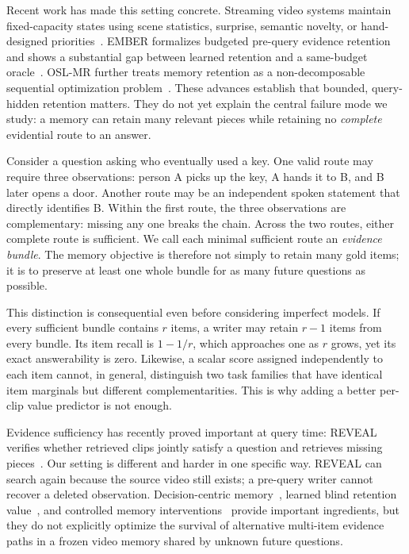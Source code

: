\documentclass[10pt,twocolumn,letterpaper]{article}
\begin{document}
Recent work has made this setting concrete.
Streaming video systems maintain fixed-capacity states using scene statistics, surprise, semantic novelty, or hand-designed priorities~\cite{xie2026fluxmemadaptivehierarchicalmemory,wu2026semanticawareadaptivevisualmemory,ge2026streamingvideomodelremember,song2026dynamicfixedbudgetmemorybank,fu2026streamflowdynamicmemoryflows}.
EMBER formalizes budgeted pre-query evidence retention and shows a substantial gap between learned retention and a same-budget oracle~\cite{li2026emberefficientmemorybudgeted}.
OSL-MR further treats memory retention as a non-decomposable sequential optimization problem~\cite{kang2026learningrememberobservabilitysafememory}.
These advances establish that bounded, query-hidden retention matters.
They do not yet explain the central failure mode we study: a memory can retain many relevant pieces while retaining no \emph{complete} evidential route to an answer.

Consider a question asking who eventually used a key.
One valid route may require three observations: person A picks up the key, A hands it to B, and B later opens a door.
Another route may be an independent spoken statement that directly identifies B.
Within the first route, the three observations are complementary: missing any one breaks the chain.
Across the two routes, either complete route is sufficient.
We call each minimal sufficient route an \emph{evidence bundle}.
The memory objective is therefore not simply to retain many gold items; it is to preserve at least one whole bundle for as many future questions as possible.

This distinction is consequential even before considering imperfect models.
If every sufficient bundle contains $r$ items, a writer may retain $r-1$ items from every bundle.
Its item recall is $1-1/r$, which approaches one as $r$ grows, yet its exact answerability is zero.
Likewise, a scalar score assigned independently to each item cannot, in general, distinguish two task families that have identical item marginals but different complementarities.
This is why adding a better per-clip value predictor is not enough.

Evidence sufficiency has recently proved important at query time: REVEAL verifies whether retrieved clips jointly satisfy a question and retrieves missing pieces~\cite{yan2026revealrubricguidedagentexplicit}.
Our setting is different and harder in one specific way.
REVEAL can search again because the source video still exists; a pre-query writer cannot recover a deleted observation.
Decision-centric memory~\cite{zou2026rememberdecisiondescriptionratedistortion}, learned blind retention value~\cite{chen2026learningremembercognitivelygrounded}, and controlled memory interventions~\cite{srivastava2026causalinterventionbasedmemoryselection,guan2026decisionawarememorycardscounterfactualinspired} provide important ingredients, but they do not explicitly optimize the survival of alternative multi-item evidence paths in a frozen video memory shared by unknown future questions.
\end{document}
